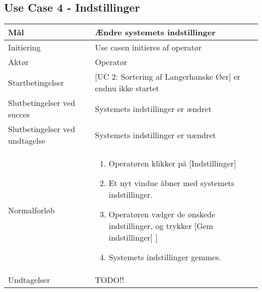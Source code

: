 \subsection{Use Case 4 - Indstillinger}
\begin{center}
		\begin{longtable}{ | m{4cm} | m{8cm}| } 
			\hline
			Mål & Ændre systemets indstillinger \\ 
			\hline
			Initiering &  Use casen initieres af operatør\\
			\hline
			Aktør & Operatør \\ 
			\hline
			Startbetingelser & [UC 2: Sortering af Langerhanske Øer] er endnu ikke startet\\ 
			\hline	
			Slutbetingelser ved succes & Systemets indstillinger er ændret \\
			\hline
			Slutbetingelser ved undtagelse & Systemets indstillinger er uændret \\
			\hline
			Normalforløb & \begin{enumerate}
				\setlength\itemsep{0cm} %
				\item Operatøren klikker på [Indstillinger]
				\item Et nyt vindue åbner med systemets indstillinger.
				\item Operatøren vælger de ønskede indstillinger, og trykker [Gem indstillinger]
				\subitem [Undtagelse 1: Operatøren klikker [Annuller]]
				\item Systemets indstillinger gemmes.
			\end{enumerate} \\ 
			\hline
			Undtagelser & TODO!!\\
			\hline
		\end{longtable}
		
	\end{center}
	\pagebreak
